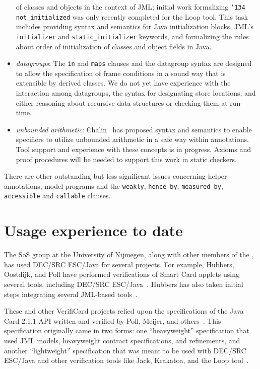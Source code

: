 \documentclass{article}
\begin{document}
\begin{itemize}
of classes and objects in the context of JML; initial work formalizing
\texttt{\char'134 not\_initialized} was only recently completed for
the Loop tool.  This task includes providing syntax and semantics for
Java initialization blocks, JML's  \texttt{initializer} and \texttt{static\_initializer} keywords, and formalizing the rules about order of initialization of classes and object fields in Java.
\item \textit{datagroups}:  The \texttt{in} and \texttt{maps} clauses and the datagroup syntax are designed
to allow the specification of frame conditions in a sound way that is extensible by derived classes. 
We do not yet have experience with the interaction among datagroups, the syntax for designating store locations, and either reasoning about recursive data structures or checking them at 
run-time.
\item \textit{unbounded
  arithmetic}:  Chalin~\cite{Chalin03} has proposed syntax and semantics to enable specifiers to utilize unbounded arithmetic in a safe way within annotations.  Tool support and experience with
these concepts is in progress.  Axioms and proof procedures will be needed to support this work
in static checkers.
\end{itemize}
There are other outstanding but less significant issues concerning helper annotations, 
model programs and the \texttt{weakly}, \texttt{hence\_by}, \texttt{measured\_by},
\texttt{accessible} and \texttt{callable} clauses. 

\section{Usage experience to date}
\label{sec:usage-exper-date}
The SoS group at the University of Nijmegen, along with other members
of the , 
has used DEC/SRC ESC/Java for several projects.  For
example, Hubbers, Oostdijk, and Poll have performed verifications of
Smart Card applets using several tools, including DEC/SRC
ESC/Java~\cite{HOP04}.  Hubbers has also taken initial steps
integrating several JML-based tools~\cite{Hub03}.

These and other VerifiCard projects relied upon the specifications of
the Java Card 2.1.1 API written and verified by Poll, Meijer, and
others~\cite{MeijerPoll01}.  This specification originally came in two
forms: one ``heavyweight'' specification that used JML models,
heavyweight contract specifications, and refinements, and another
``lightweight'' specification that was meant to be used with DEC/SRC
ESC/Java and other verification tools like Jack, Krakatoa, and the
Loop tool~\cite{BergJ01,BurdyRequet02,MarchePaulinMohringUrbain04}.
\end{document}
